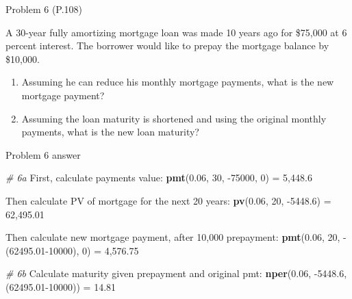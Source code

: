 \documentclass[ignorenonframetext,]{beamer}
\newenvironment{Shaded}{\begin{snugshade}}{\end{snugshade}}
\newcommand{\KeywordTok}[1]{\textcolor[rgb]{0.13,0.29,0.53}{\textbf{{#1}}}}
\newcommand{\DecValTok}[1]{\textcolor[rgb]{0.00,0.00,0.81}{{#1}}}
\newcommand{\FloatTok}[1]{\textcolor[rgb]{0.00,0.00,0.81}{{#1}}}
\newcommand{\StringTok}[1]{\textcolor[rgb]{0.31,0.60,0.02}{{#1}}}
\newcommand{\CommentTok}[1]{\textcolor[rgb]{0.56,0.35,0.01}{\textit{{#1}}}}
\newcommand{\NormalTok}[1]{{#1}}
\providecommand{\tightlist}{%
\setlength{\itemsep}{0pt}\setlength{\parskip}{0pt}}
\begin{document}
\begin{frame}{Problem 6 (P.108)}

A 30-year fully amortizing mortgage loan was made 10 years ago for
\$75,000 at 6 percent interest. The borrower would like to prepay the
mortgage balance by \$10,000.

\begin{enumerate}
\def\labelenumi{\alph{enumi}.}
\tightlist
\item
  Assuming he can reduce his monthly mortgage payments, what is the new
  mortgage payment?
\item
  Assuming the loan maturity is shortened and using the original monthly
  payments, what is the new loan maturity?
\end{enumerate}

\end{frame}

\begin{frame}[fragile]{Problem 6 answer}

\small

\begin{Shaded}
\begin{Highlighting}[]
\CommentTok{# 6a }
\NormalTok{First, calculate payments value:}\StringTok{ }
\KeywordTok{pmt}\NormalTok{(}\FloatTok{0.06}\NormalTok{, }\DecValTok{30}\NormalTok{, -}\DecValTok{75000}\NormalTok{, }\DecValTok{0}\NormalTok{) =}\StringTok{ }\DecValTok{5}\NormalTok{,}\FloatTok{448.6}

\NormalTok{Then calculate PV of mortgage for the next }\DecValTok{20} \NormalTok{years:}
\KeywordTok{pv}\NormalTok{(}\FloatTok{0.06}\NormalTok{, }\DecValTok{20}\NormalTok{, -}\FloatTok{5448.6}\NormalTok{) =}\StringTok{ }\DecValTok{62}\NormalTok{,}\FloatTok{495.01}

\NormalTok{Then calculate new mortgage payment, after }\DecValTok{10}\NormalTok{,}\DecValTok{000} \NormalTok{prepayment:}
\KeywordTok{pmt}\NormalTok{(}\FloatTok{0.06}\NormalTok{, }\DecValTok{20}\NormalTok{, -(}\FloatTok{62495.01}\DecValTok{-10000}\NormalTok{), }\DecValTok{0}\NormalTok{) =}\StringTok{ }\DecValTok{4}\NormalTok{,}\FloatTok{576.75}


\CommentTok{# 6b}
\NormalTok{Calculate maturity given prepayment and original pmt:}
\KeywordTok{nper}\NormalTok{(}\FloatTok{0.06}\NormalTok{, -}\FloatTok{5448.6}\NormalTok{, (}\FloatTok{62495.01}\DecValTok{-10000}\NormalTok{)) =}\StringTok{ }\FloatTok{14.81}
\end{Highlighting}
\end{Shaded}

\normalsize

\end{frame}
\end{document}
